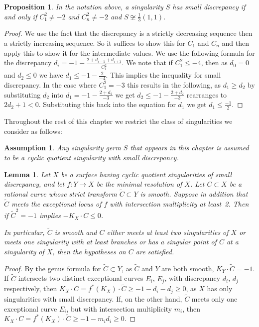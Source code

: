 \documentclass[11pt]{amsbook}
\theoremstyle{plain}
\newtheorem{prop}[thm]{Proposition}
\newtheorem{lem}[thm]{Lemma}
\newtheorem{assumption}[thm]{Assumption}
\newcommand{\wt}[1]{\widetilde #1}
\begin{document}
\begin{prop}
In the notation above,
a singularity $S$ has small discrepancy if and only if $C_1^2 \neq -2$ and $C_n^2 \neq -2$ and $ S \not\cong \frac{1}{3}(1,1)$.
\end{prop}
\begin{proof}
 We use the fact that the discrepancy is a strictly decreasing sequence then a strictly increasing sequence. So it suffices to show this for $C_1$ and $C_n$ and then apply this to show it for the intermediate values. We use the following formula for the discrepancy $d_i =  -1 - \frac{2 + d_{i-1}+d_{i+1}}{C_i^2}$. We note that if $C_1^2 \leq -4$, then as $d_0 = 0$ and $d_2 \leq 0$ we have $d_1 \leq -1 - \frac{2}{-4}$. This implies the inequality for small discrepancy. In the case where $C_1^2 = -3$ this results in the following, as $d_1 \geq d_2$ by substituting $d_2$ into $d_1 = -1 - \frac{2 + d_2}{-3}$ we get  $ d_2 \leq -1 - \frac{2 + d_2}{-3}$ rearranges to $2d_2 + 1 < 0$. Substituting this back into the equation for $d_1$ we get $d_1 \leq  \frac{-1}{2}$. 
 \end{proof}


Throughout the rest of this chapter we restrict the class of singularities we consider as follows:

\begin{assumption}
Any singularity germ $S$ that appears in this chapter is assumed to be a cyclic
quotient singularity with small discrepancy.
\end{assumption}

\begin{lem}\label{lem!badcurve}
Let $X$ be a surface having cyclic quotient singularities of small discrepancy, and let  $f \colon Y \rightarrow X$ be the minimal resolution of $X$. Let $C \subset X$ be a rational curve whose 
strict transform $\widetilde C \subset Y$ is smooth. Suppose in addition that 
$\widetilde C$ meets the exceptional locus of $f$ with intersection multiplicity at least~2.
Then if $\widetilde C^2 = -1$ implies $-K_X \cdot C \leq 0$.

In particular, $\widetilde C$ is smooth and
$C$ either meets at least two singularities of $X$ or meets one singularity
with at least branches or has a singular point of $C$ at a singularity of $X$,
then the hypotheses on $C$ are satisfied.
\end{lem}
\begin{proof}
By the genus formula for $\widetilde C\subset Y$, as $\widetilde C$ and $Y$ are both smooth,
$K_Y \cdot \widetilde C = -1$. If $\wt C$ intersects two distinct exceptional curves $E_i$, $E_j$,
with discrepancy $d_i$, $d_j$ respectively, then
 $K_X \cdot C = f^*(K_X) \cdot \widetilde C \geq -1 - d_i - d_j  \geq 0$,
 as $X$ has only singularities with small discrepancy. 
 If, on the other hand, $\wt C$ meets only one exceptional curve $E_i$, but with intersection
multiplicity $m_i$, then $K_X \cdot C = f^*(K_X) \cdot \widetilde C \geq -1 - m_id_i  \geq 0$.
\end{proof}
\end{document}
